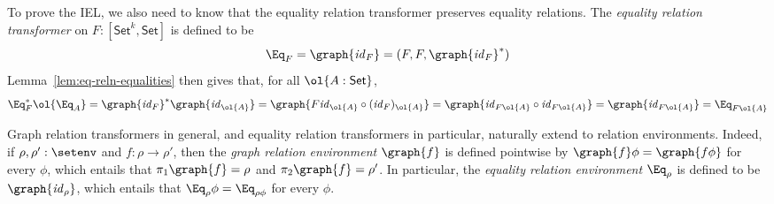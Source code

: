 \documentclass{lmcs}
\theoremstyle{plain}\newtheorem{satz}[thm]{Satz}
\newcommand{\set}{\mathsf{Set}}
\renewcommand{\id}{\mathit{id}}
\begin{document}
To prove the IEL, we also need to know that the equality relation
transformer preserves equality relations.  The {\em equality relation
  transformer} on $F : [\set^k,\set]$ is defined to be
\begin{equation}\label{def:eq-transf}
  \Eq_F = \graph{\id_{F}} = (F, F, \graph{\id_{F}}^*)
\end{equation}  
Lemma~\ref{lem:eq-reln-equalities} then gives that, for all $\ol{A :
\set}$,
\begin{equation}\label{eq:eq-pres-eq}
\Eq^*_F \ol{\Eq_A}
= \graph{\id_F}^* \graph{\id_{\ol{A}}}
= \graph{F \id_{\ol{A}} \circ (\id_F)_{\ol{A}}}
= \graph{\id_{F\ol{A}} \circ \id_{F\ol{A}}}
= \graph{\id_{F\ol{A}}}
= \Eq_{F\ol{A}}
\end{equation}

Graph relation transformers in general, and equality relation
transformers in particular, naturally extend to relation environments.
Indeed, if $\rho, \rho' : \setenv$ and $f : \rho \to \rho'$, then the
{\em graph relation environment} $\graph{f}$ is defined pointwise by
$\graph{f} \phi = \graph{f \phi}$ for every $\phi$, which entails that
$\pi_1 \graph{f} = \rho$ and $\pi_2 \graph{f} = \rho'$. In particular,
the {\em equality relation environment} $\Eq_\rho$ is defined to be
$\graph{\id_{\rho}}$, which entails that $\Eq_\rho \phi = \Eq_{\rho
  \phi}$ for every $\phi$.
\end{document}
